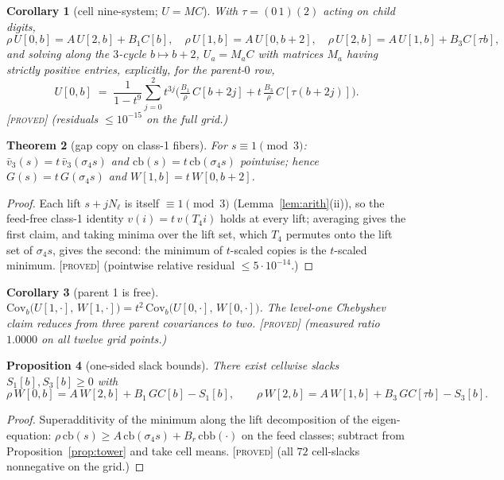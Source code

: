 \documentclass[11pt]{article}
\newtheorem{theorem}{Theorem}[section]
\newtheorem{proposition}[theorem]{Proposition}
\newtheorem{corollary}[theorem]{Corollary}
\theoremstyle{definition}
\newcommand{\PROVED}{\textup{[\textsc{proved}]}}
\begin{document}
\begin{corollary}[cell nine-system; $U = MC$]\label{cor:ninesys}
With $\tau = (0\,1)(2)$ acting on child digits,
\[
\rho\,U[0,b] = A\,U[2,b] + B_1 C[b], \quad
\rho\,U[1,b] = A\,U[0,b+2], \quad
\rho\,U[2,b] = A\,U[1,b] + B_3 C[\tau b],
\]
and solving along the $3$-cycle $b \mapsto b+2$,
$U_a = M_a C$ with matrices $M_a$ having \emph{strictly positive} entries,
explicitly, for the parent-$0$ row,
\[
U[0,b] \;=\; \frac{1}{1-t^9} \sum_{j=0}^{2} t^{3j}
\Big( \tfrac{B_1}{\rho}\, C[b+2j] + t\,\tfrac{B_3}{\rho}\, C[\tau(b+2j)] \Big).
\]
\PROVED{} (residuals $\le 10^{-15}$ on the full grid.)
\end{corollary}

\begin{theorem}[gap copy on class-1 fibers]\label{thm:gapcopy}
For $s \equiv 1 \pmod 3$: $\bar v_3(s) = t\, \bar v_3(\sigma_4 s)$ \emph{and}
$\mathrm{cb}(s) = t\, \mathrm{cb}(\sigma_4 s)$ pointwise; hence
$G(s) = t\,G(\sigma_4 s)$ and $W[1,b] = t\,W[0,b+2]$.
\end{theorem}

\begin{proof}
Each lift $s + jN_\ell$ is itself $\equiv 1 \pmod 3$
(Lemma~\ref{lem:arith}(ii)), so the feed-free class-1 identity
$v(i) = t\,v(T_4 i)$ holds at every lift; averaging gives the first claim,
and taking minima over the lift set, which $T_4$ permutes onto the lift set of
$\sigma_4 s$, gives the second: the minimum of $t$-scaled copies is the
$t$-scaled minimum. \PROVED{} (pointwise relative residual
$\le 5 \cdot 10^{-14}$.)
\end{proof}

\begin{corollary}[parent 1 is free]\label{cor:parent1}
$\mathrm{Cov}_b\big(U[1,\cdot],\, W[1,\cdot]\big) =
t^2\, \mathrm{Cov}_b\big(U[0,\cdot],\, W[0,\cdot]\big)$. The level-one
Chebyshev claim reduces from three parent covariances to two.
\PROVED{} (measured ratio $1.0000$ on all twelve grid points.)
\end{corollary}

\begin{proposition}[one-sided slack bounds]\label{prop:slack}
There exist cellwise slacks $S_1[b], S_3[b] \ge 0$ with
\[
\rho\,W[0,b] = A\,W[2,b] + B_1\,GC[b] - S_1[b], \qquad
\rho\,W[2,b] = A\,W[1,b] + B_3\,GC[\tau b] - S_3[b].
\]
\end{proposition}

\begin{proof}
Superadditivity of the minimum along the lift decomposition of the
eigen-equation: $\rho\,\mathrm{cb}(s) \ge A\,\mathrm{cb}(\sigma_4 s) +
B_r\,\mathrm{cbb}(\cdot)$ on the feed classes; subtract from
Proposition~\ref{prop:tower} and take cell means. \PROVED{} (all $72$
cell-slacks nonnegative on the grid.)
\end{proof}
\end{document}
